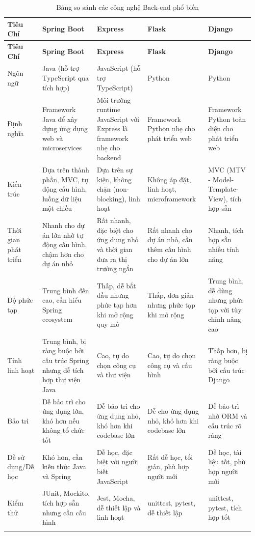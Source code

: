 \begin{enumerate}[(a)]
\begin{landscape}  %
\begin{longtable}{|p{3.5cm}|p{5cm}|p{5cm}|p{5cm}|p{5cm}|}
\hline
\textbf{Tiêu Chí} & \textbf{Spring Boot} & \textbf{Express} & \textbf{Flask} & \textbf{Django} \\
\hline
\endfirsthead
\hline
\textbf{Tiêu Chí} & \textbf{Spring Boot} & \textbf{Express} & \textbf{Flask} & \textbf{Django} \\
\hline
\endhead
\hline
Ngôn ngữ & Java (hỗ trợ TypeScript qua tích hợp) & JavaScript (hỗ trợ TypeScript) & Python & Python \\
\hline
Định nghĩa & Framework Java để xây dựng ứng dụng web và microservices & Môi trường runtime JavaScript với Express là framework nhẹ cho backend & Framework Python nhẹ cho phát triển web & Framework Python toàn diện cho phát triển web \\
\hline
Kiến trúc & Dựa trên thành phần, MVC, tự động cấu hình, luồng dữ liệu một chiều & Dựa trên sự kiện, không chặn (non-blocking), linh hoạt & Không áp đặt, linh hoạt, microframework & MVC (MTV - Model-Template-View), tích hợp sẵn \\
\hline
Thời gian phát triển & Nhanh cho dự án lớn nhờ tự động cấu hình, chậm hơn cho dự án nhỏ & Rất nhanh, đặc biệt cho ứng dụng nhỏ và thời gian đưa ra thị trường ngắn & Rất nhanh cho dự án nhỏ, cần thêm cấu hình cho dự án lớn & Nhanh, tích hợp sẵn nhiều tính năng \\
\hline
Độ phức tạp & Trung bình đến cao, cần hiểu Spring ecosystem & Thấp, dễ bắt đầu nhưng phức tạp hơn khi mở rộng quy mô & Thấp, đơn giản nhưng phức tạp khi mở rộng & Trung bình, dễ dùng nhưng phức tạp với tùy chỉnh nâng cao \\
\hline
Tính linh hoạt & Trung bình, bị ràng buộc bởi cấu trúc Spring nhưng dễ tích hợp thư viện Java & Cao, tự do chọn công cụ và thư viện & Cao, tự do chọn công cụ và cấu hình & Thấp hơn, bị ràng buộc bởi cấu trúc Django \\
\hline
Bảo trì & Dễ bảo trì cho ứng dụng lớn, khó hơn nếu không tổ chức tốt & Dễ bảo trì cho ứng dụng nhỏ, khó hơn khi codebase lớn & Dễ cho ứng dụng nhỏ, khó hơn khi codebase lớn & Dễ bảo trì nhờ ORM và cấu trúc rõ ràng \\
\hline
Dễ sử dụng/Dễ học & Khó hơn, cần kiến thức Java và Spring & Dễ học, đặc biệt với người biết JavaScript & Rất dễ học, tối giản, phù hợp người mới & Dễ học, tài liệu tốt, phù hợp người mới \\
\hline
Kiểm thử & JUnit, Mockito, tích hợp sẵn nhưng cần cấu hình & Jest, Mocha, dễ thiết lập và linh hoạt & unittest, pytest, dễ thiết lập & unittest, pytest, tích hợp tốt \\
\hline
\caption{Bảng so sánh các công nghệ Back-end phổ biến}
\end{longtable}
\end{landscape}


\end{enumerate}
